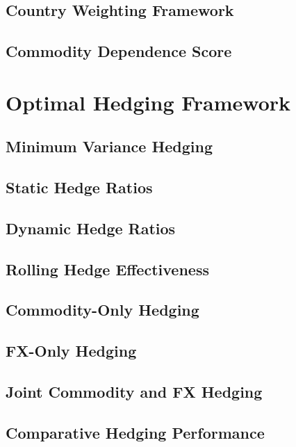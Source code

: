 \documentclass{article}
\begin{document}
\subsection{Country Weighting Framework}

\subsection{Commodity Dependence Score}

\section{Optimal Hedging Framework}

\subsection{Minimum Variance Hedging}

\subsection{Static Hedge Ratios}

\subsection{Dynamic Hedge Ratios}

\subsection{Rolling Hedge Effectiveness}

\subsection{Commodity-Only Hedging}

\subsection{FX-Only Hedging}

\subsection{Joint Commodity and FX Hedging}

\subsection{Comparative Hedging Performance}
\end{document}
